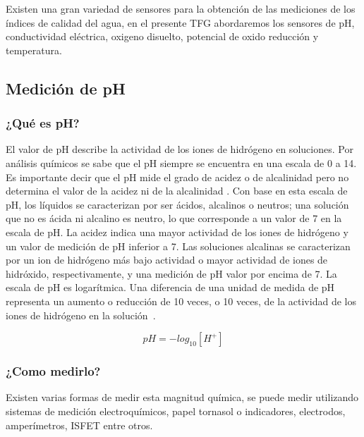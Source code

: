 Existen una gran variedad de sensores para la obtención de las mediciones de los índices de calidad del agua, en el presente TFG abordaremos los sensores de pH, conductividad eléctrica, oxigeno disuelto, potencial de oxido reducción y temperatura. 

\subsection{Medición de pH}
\subsubsection{¿Qué es pH?}

El valor de pH describe la actividad de los iones de hidrógeno en soluciones. 
Por análisis químicos se sabe que el pH siempre se encuentra en una escala de 0 a 14. 
Es importante decir que el pH mide el grado de acidez o de alcalinidad pero no determina el valor de la acidez ni de la alcalinidad \cite{sierra_ramirez_calidad_2011}. 
Con base en esta escala de pH, los líquidos se caracterizan por ser ácidos, alcalinos o neutros; una solución que no es ácida ni alcalino es neutro, lo que corresponde a un valor de 7 en la escala de pH. 
La acidez indica una mayor actividad de los iones de hidrógeno y un valor de medición de pH inferior a 7. 
Las soluciones alcalinas se caracterizan por un ion de hidrógeno más bajo actividad o mayor actividad de iones de hidróxido, respectivamente, y una medición de pH valor por encima de 7.
La escala de pH es logarítmica. Una diferencia de una unidad de medida de pH representa un aumento o reducción de 10 veces, o 10 veces, de la actividad de los iones de hidrógeno en la solución~\cite{covington_definition_1985}.

\begin{equation} \label{ecuacionpH} 
pH=-log_{10}[H^{+}]
\end{equation}


\subsubsection{¿Como medirlo?}
Existen varias formas de medir esta magnitud química, se puede medir utilizando sistemas de medición electroquímicos, papel tornasol o indicadores, electrodos, amperímetros, ISFET entre otros. 

